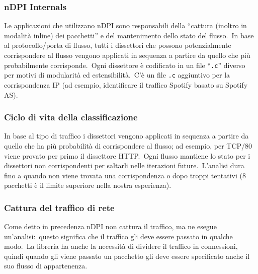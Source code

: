 \subsubsection{nDPI Internals}

Le applicazioni che utilizzano nDPI sono responsabili della ``cattura (inoltro in modalità inline) dei pacchetti'' e del mantenimento dello stato del flusso.\
In base al protocollo/porta di flusso, tutti i dissettori che possono potenzialmente corrispondere al flusso vengono applicati in sequenza a partire da quello che più probabilmente corrisponde.\
Ogni dissettore è codificato in un file ``\texttt{.c}'' diverso per motivi di modularità ed estensibilità.\
C'è un file \texttt{.c} aggiuntivo per la corrispondenza IP (ad esempio, identificare il traffico Spotify basato su Spotify AS).

\subsubsection{Ciclo di vita della classificazione}

In base al tipo di traffico i dissettori vengono applicati in sequenza a partire da quello che ha più probabilità di corrispondere al flusso; ad esempio, per TCP/80 viene provato per primo il dissettore HTTP.\
Ogni flusso mantiene lo stato per i dissettori non corrispondenti per saltarli nelle iterazioni future.\
L'analisi dura fino a quando non viene trovata una corrispondenza o dopo troppi tentativi (8 pacchetti è il limite superiore nella nostra esperienza).\

\subsubsection{Cattura del traffico di rete}

Come detto in precedenza nDPI non cattura il traffico, ma ne esegue un'analisi:\ questo significa che il traffico gli deve essere passato in qualche modo.\
La libreria ha anche la necessità di dividere il traffico in connessioni, quindi quando gli viene passato un pacchetto gli deve essere specificato anche il suo flusso di appartenenza.\

